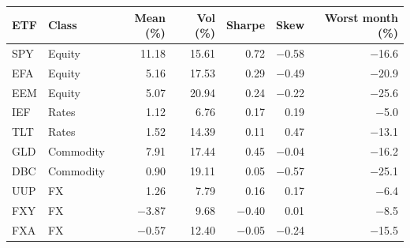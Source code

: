 \begin{tabular}{llrrrrr}
\toprule
ETF & Class & Mean (\%) & Vol (\%) & Sharpe & Skew & Worst month (\%) \\
\midrule
SPY & Equity & 11.18 & 15.61 & 0.72 & $-$0.58 & $-$16.6 \\
EFA & Equity & 5.16 & 17.53 & 0.29 & $-$0.49 & $-$20.9 \\
EEM & Equity & 5.07 & 20.94 & 0.24 & $-$0.22 & $-$25.6 \\
IEF & Rates & 1.12 & 6.76 & 0.17 & 0.19 & $-$5.0 \\
TLT & Rates & 1.52 & 14.39 & 0.11 & 0.47 & $-$13.1 \\
GLD & Commodity & 7.91 & 17.44 & 0.45 & $-$0.04 & $-$16.2 \\
DBC & Commodity & 0.90 & 19.11 & 0.05 & $-$0.57 & $-$25.1 \\
UUP & FX & 1.26 & 7.79 & 0.16 & 0.17 & $-$6.4 \\
FXY & FX & $-$3.87 & 9.68 & $-$0.40 & 0.01 & $-$8.5 \\
FXA & FX & $-$0.57 & 12.40 & $-$0.05 & $-$0.24 & $-$15.5 \\
\bottomrule
\end{tabular}
